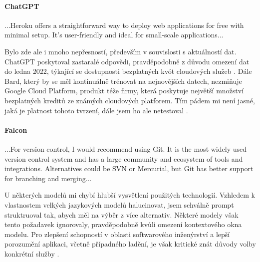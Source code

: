 \documentclass[FM,DP]{tulthesis}
\begin{document}
		\vspace{0.6em}
		\begin{tcolorbox}[colback=white,colframe=black]
			\paragraph{ChatGPT}
			...Heroku offers a straightforward way to deploy web applications for free with minimal setup. It's user-friendly and ideal for small-scale applications... \cite{chatgpt_navrh}
		\end{tcolorbox}
		\vspace{0.6em}
		
		Bylo zde ale i mnoho nepřesností, především v souvislosti s aktuálností dat. ChatGPT poskytoval zastaralé odpovědi, pravděpodobně z důvodu omezení dat do ledna 2022, týkající se dostupnosti bezplatných kvót cloudových služeb \cite{chatgpt_navrh} \cite{chatgpt_knowledge}. Dále Bard, který by se měl kontinuálně trénovat na nejnovějších datech, nezmiňuje Google Cloud Platform, produkt téže firmy, která poskytuje největší množství bezplatných kreditů ze známých cloudových platforem. Tím pádem mi není jasné, jaká je platnost tohoto tvrzení, dále jsem ho ale netestoval \cite{bard_navrh} \cite{GCP} \cite{Heroku}.
		
		\vspace{0.6em}
		\begin{tcolorbox}[colback=white,colframe=black]
			\paragraph{Falcon}
			...For version control, I would recommend using Git. It is the most widely used version control system and has a large community and ecosystem of tools and integrations. Alternatives could be SVN or Mercurial, but Git has better support for branching and merging... \cite{falcon_navrh}
		\end{tcolorbox}
		\vspace{0.6em}
		
		U některých modelů mi chybí hlubší vysvětlení použitých technologií. Vzhledem k vlastnostem velkých jazykových modelů halucinovat, jsem schválně prompt struktruoval tak, abych měl na výběr z více alternativ. Některé modely však tento požadavek ignorovaly, pravděpodobně kvůli omezení kontextového okna modelu. Pro zlepšení schopností v oblasti softwarového inženýrství a lepší porozumění aplikaci, včetně případného ladění, je však kritické znát důvody volby konkrétní služby \cite{gitCopilot_navrh} \cite{falcon_navrh}.
		
\end{document}
